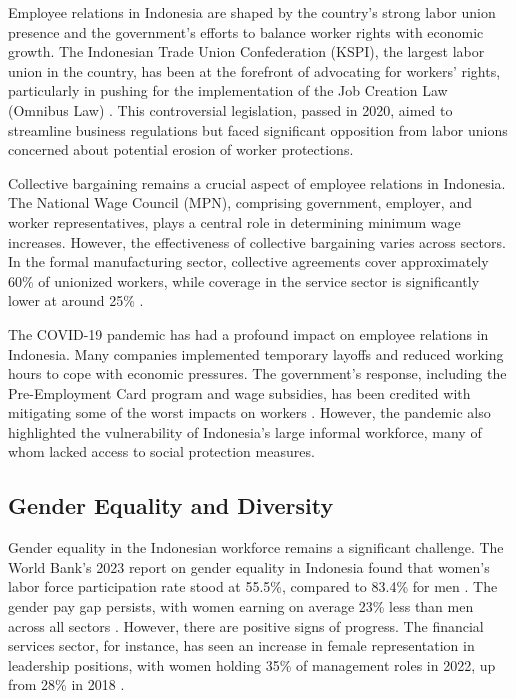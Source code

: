 Employee relations in Indonesia are shaped by the country's strong labor union presence and the government's efforts to balance worker rights with economic growth. The Indonesian Trade Union Confederation (KSPI), the largest labor union in the country, has been at the forefront of advocating for workers' rights, particularly in pushing for the implementation of the Job Creation Law (Omnibus Law) \cite{ref6}. This controversial legislation, passed in 2020, aimed to streamline business regulations but faced significant opposition from labor unions concerned about potential erosion of worker protections.

Collective bargaining remains a crucial aspect of employee relations in Indonesia. The National Wage Council (MPN), comprising government, employer, and worker representatives, plays a central role in determining minimum wage increases. However, the effectiveness of collective bargaining varies across sectors. In the formal manufacturing sector, collective agreements cover approximately 60\% of unionized workers, while coverage in the service sector is significantly lower at around 25\% \cite{ref7}.

The COVID-19 pandemic has had a profound impact on employee relations in Indonesia. Many companies implemented temporary layoffs and reduced working hours to cope with economic pressures. The government's response, including the Pre-Employment Card program and wage subsidies, has been credited with mitigating some of the worst impacts on workers \cite{ref8}. However, the pandemic also highlighted the vulnerability of Indonesia's large informal workforce, many of whom lacked access to social protection measures.

\subsection{Gender Equality and Diversity}

Gender equality in the Indonesian workforce remains a significant challenge. The World Bank's 2023 report on gender equality in Indonesia found that women's labor force participation rate stood at 55.5\%, compared to 83.4\% for men \cite{ref9}. The gender pay gap persists, with women earning on average 23\% less than men across all sectors \cite{ref10}. However, there are positive signs of progress. The financial services sector, for instance, has seen an increase in female representation in leadership positions, with women holding 35\% of management roles in 2022, up from 28\% in 2018 \cite{ref11}.

